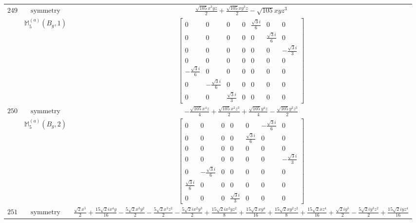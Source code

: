 \documentclass[fleqn,8pt,landscape]{jsarticle}
\begin{document}
\begin{longtable}{ccc}
$ 249 $ & $ \text{symmetry} $ & $ \frac{\sqrt{105} x^{3} y z}{2} + \frac{\sqrt{105} x y^{3} z}{2} - \sqrt{105} x y z^{3} $ \\
$  $ & $ \mathbb{M}_{5}^{(a)}(B_{g},1) $ & $ \begin{bmatrix} 0 & 0 & 0 & 0 & \frac{\sqrt{3} i}{6} & 0 & 0 \\ 0 & 0 & 0 & 0 & 0 & \frac{\sqrt{3} i}{6} & 0 \\ 0 & 0 & 0 & 0 & 0 & 0 & - \frac{\sqrt{3} i}{3} \\ 0 & 0 & 0 & 0 & 0 & 0 & 0 \\ - \frac{\sqrt{3} i}{6} & 0 & 0 & 0 & 0 & 0 & 0 \\ 0 & - \frac{\sqrt{3} i}{6} & 0 & 0 & 0 & 0 & 0 \\ 0 & 0 & \frac{\sqrt{3} i}{3} & 0 & 0 & 0 & 0 \end{bmatrix} $ \\ \hline
$ 250 $ & $ \text{symmetry} $ & $ - \frac{\sqrt{105} x^{4} z}{4} + \frac{\sqrt{105} x^{2} z^{3}}{2} + \frac{\sqrt{105} y^{4} z}{4} - \frac{\sqrt{105} y^{2} z^{3}}{2} $ \\
$  $ & $ \mathbb{M}_{5}^{(a)}(B_{g},2) $ & $ \begin{bmatrix} 0 & 0 & 0 & 0 & 0 & - \frac{\sqrt{3} i}{6} & 0 \\ 0 & 0 & 0 & 0 & \frac{\sqrt{3} i}{6} & 0 & 0 \\ 0 & 0 & 0 & 0 & 0 & 0 & 0 \\ 0 & 0 & 0 & 0 & 0 & 0 & - \frac{\sqrt{3} i}{3} \\ 0 & - \frac{\sqrt{3} i}{6} & 0 & 0 & 0 & 0 & 0 \\ \frac{\sqrt{3} i}{6} & 0 & 0 & 0 & 0 & 0 & 0 \\ 0 & 0 & 0 & \frac{\sqrt{3} i}{3} & 0 & 0 & 0 \end{bmatrix} $ \\ \hline
$ 251 $ & $ \text{symmetry} $ & $ \frac{\sqrt{2} x^{5}}{2} + \frac{15 \sqrt{2} i x^{4} y}{16} - \frac{5 \sqrt{2} x^{3} y^{2}}{2} - \frac{5 \sqrt{2} x^{3} z^{2}}{2} - \frac{5 \sqrt{2} i x^{2} y^{3}}{2} + \frac{15 \sqrt{2} i x^{2} y z^{2}}{8} + \frac{15 \sqrt{2} x y^{4}}{16} + \frac{15 \sqrt{2} x y^{2} z^{2}}{8} + \frac{15 \sqrt{2} x z^{4}}{16} + \frac{\sqrt{2} i y^{5}}{2} - \frac{5 \sqrt{2} i y^{3} z^{2}}{2} + \frac{15 \sqrt{2} i y z^{4}}{16} $ \\

\end{longtable}
\end{document}
